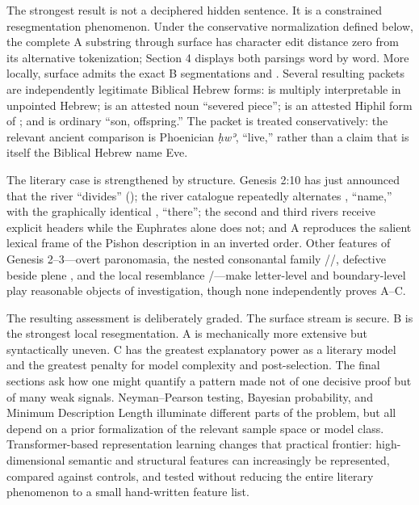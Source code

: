 The strongest result is not a deciphered hidden sentence.  It is a constrained resegmentation phenomenon.  Under the conservative normalization defined below, the complete A substring through surface  has character edit distance zero from its alternative tokenization; Section 4 displays both parsings word by word.  More locally, surface  admits the exact B segmentations  and .  Several resulting packets are independently legitimate Biblical Hebrew forms:  is multiply interpretable in unpointed Hebrew;  is an attested noun ``severed piece'';  is an attested Hiphil form of ; and  is ordinary ``son, offspring.''  The packet  is treated conservatively: the relevant ancient comparison is Phoenician \textit{ḥwʾ}, ``live,'' rather than a claim that  is itself the Biblical Hebrew name Eve.

The literary case is strengthened by structure.  Genesis 2:10 has just announced that the river ``divides'' (); the river catalogue repeatedly alternates , ``name,'' with the graphically identical , ``there''; the second and third rivers receive explicit  headers while the Euphrates alone does not; and A reproduces the salient lexical frame of the Pishon description in an inverted order.  Other features of Genesis 2--3---overt paronomasia, the nested consonantal family //, defective  beside plene , and the local resemblance /---make letter-level and boundary-level play reasonable objects of investigation, though none independently proves A--C.

The resulting assessment is deliberately graded.  The surface stream is secure.  B is the strongest local resegmentation.  A is mechanically more extensive but syntactically uneven.  C has the greatest explanatory power as a literary model and the greatest penalty for model complexity and post-selection.  The final sections ask how one might quantify a pattern made not of one decisive proof but of many weak signals.  Neyman--Pearson testing, Bayesian probability, and Minimum Description Length illuminate different parts of the problem, but all depend on a prior formalization of the relevant sample space or model class.  Transformer-based representation learning changes that practical frontier: high-dimensional semantic and structural features can increasingly be represented, compared against controls, and tested without reducing the entire literary phenomenon to a small hand-written feature list.


